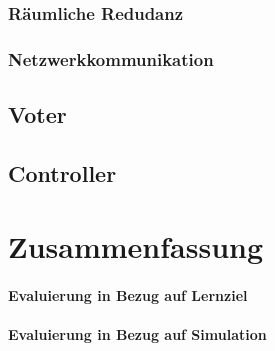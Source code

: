 \documentclass[ngerman]{scrartcl}
\begin{document}
\subsubsection{R{\"{a}}umliche Redudanz}
\subsubsection{Netzwerkkommunikation}
\subsection{Voter}
\subsection{Controller}\label{controller}
\section{Zusammenfassung}
\paragraph{Evaluierung in Bezug auf Lernziel}
\paragraph{Evaluierung in Bezug auf Simulation}
\end{document}
